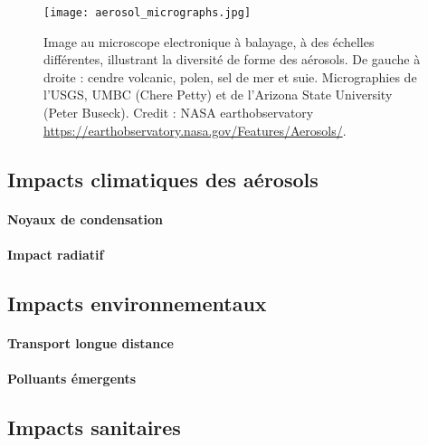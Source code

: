 \begin{figure}[ht]
    \centering
    \texttt{[image: aerosol\_micrographs.jpg]}
    \caption{Image au microscope electronique à balayage, à des échelles différentes,
        illustrant la diversité de forme des aérosols.
        De gauche à droite : cendre volcanic, polen, sel de mer et suie. Micrographies de
        l'USGS, UMBC (Chere Petty) et de l'Arizona State University (Peter Buseck). Credit
        : NASA earthobservatory
    \url{https://earthobservatory.nasa.gov/Features/Aerosols/}.}
    \label{fig:micrography}
\end{figure}

\subsection{Impacts climatiques des aérosols}%
\label{sub:impacts_climatiques_des_aerosols}
\paragraph{Noyaux de condensation}%
\label{par:noyaux_de_condensation}

\paragraph{Impact radiatif}%
\label{par:impact_radiatif}



\subsection{Impacts environnementaux}%
\label{sub:impacts_environnementaux}

\paragraph{Transport longue distance}%
\label{par:transport_longue_distance}


\paragraph{Polluants émergents}%
\label{par:polluants_emergents}



\subsection{Impacts sanitaires}%
\label{sub:impacts_sanitaires}



